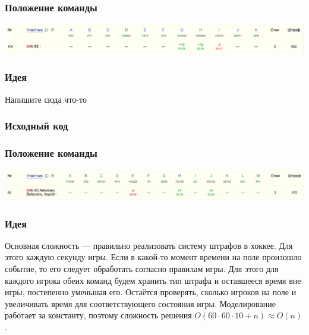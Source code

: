 \documentclass[12pt]{article}
\begin{document}
\subsubsection*{Положение команды}
\includegraphics[scale=0.25]{images/gp_dolgop.png}\newline\noindent
\pagebreak




\subsubsection*{Идея}
Напишите сюда что-то

\subsubsection*{Исходный код}

\subsubsection*{Положение команды}
\includegraphics[scale=0.25]{images/gp_korea.png}\newline\noindent
\pagebreak


\subsubsection*{Идея}
Основная сложность --- правильно реализовать систему штрафов в хоккее. Для этого каждую секунду игры. Если в какой-то момент времени на поле произошло событие, то его следует обработать согласно правилам игры. Для этого для каждого игрока обеих команд будем хранить тип штрафа и оставшееся время вне игры, постепенно уменьшая его. Остаётся проверять, сколько игроков на поле и увеличивать время для соответствующего состояния игры. Моделирование работает за константу, поэтому сложность решения $O(60 \cdot 60 \cdot 10 + n) \approx O(n)$.
\end{document}
